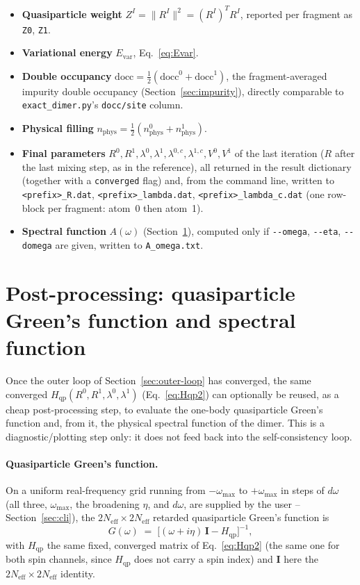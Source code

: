 \documentclass[11pt]{article}
\newcommand{\Neff}{N_{\mathrm{eff}}}
\newcommand{\Hqp}{H_{\mathrm{qp}}}
\begin{document}
\begin{itemize}
  \item \textbf{Quasiparticle weight} $Z^{I}=\lVert R^{I}\rVert^2=(R^I)^TR^I$,
    reported per fragment as \texttt{Z0}, \texttt{Z1}.
  \item \textbf{Variational energy} $E_{\mathrm{var}}$, Eq.~\eqref{eq:Evar}.
  \item \textbf{Double occupancy} $\mathrm{docc}=\tfrac12(\mathrm{docc}^0+\mathrm{docc}^1)$,
    the fragment-averaged impurity double occupancy (Section~\ref{sec:impurity}),
    directly comparable to \texttt{exact\_dimer.py}'s \texttt{docc/site} column.
  \item \textbf{Physical filling} $n_{\mathrm{phys}}=\tfrac12(n^0_{\mathrm{phys}}+n^1_{\mathrm{phys}})$.
  \item \textbf{Final parameters} $R^0,R^1,\lambda^0,\lambda^1,\lambda^{0,c},
    \lambda^{1,c},V^0,V^1$ of the last iteration ($R$ after the last mixing
    step, as in the reference), all returned in the result dictionary
    (together with a \texttt{converged} flag) and, from
    the command line, written to \texttt{<prefix>\_R.dat},
    \texttt{<prefix>\_lambda.dat}, \texttt{<prefix>\_lambda\_c.dat} (one
    row-block per fragment: atom~0 then atom~1).
  \item \textbf{Spectral function} $A(\omega)$ (Section~\ref{sec:spectral}),
    computed only if \texttt{-{}-omega}, \texttt{-{}-eta}, \texttt{-{}-domega}
    are given, written to \texttt{A\_omega.txt}.
\end{itemize}

\section{Post-processing: quasiparticle Green's function and spectral function}
\label{sec:spectral}

Once the outer loop of Section~\ref{sec:outer-loop} has converged, the same
converged $\Hqp(R^0,R^1,\lambda^0,\lambda^1)$ (Eq.~\eqref{eq:Hqp2}) can
optionally be reused, as a cheap post-processing step, to evaluate the
one-body quasiparticle Green's function and, from it, the physical spectral
function of the dimer. This is a diagnostic/plotting step only: it does not
feed back into the self-consistency loop.

\paragraph{Quasiparticle Green's function.} On a uniform real-frequency grid
running from $-\omega_{\max}$ to $+\omega_{\max}$ in steps of
$d\omega$ (all three, $\omega_{\max}$, the broadening $\eta$, and $d\omega$,
are supplied by the user -- Section~\ref{sec:cli}), the $2\Neff\times2\Neff$
retarded quasiparticle Green's function is
\begin{equation}
  G(\omega) \;=\; \bigl[(\omega+i\eta)\,\mathbf{I} - \Hqp\bigr]^{-1},
  \label{eq:Gqp}
\end{equation}
with $\Hqp$ the same fixed, converged matrix of Eq.~\eqref{eq:Hqp2} (the
same one for both spin channels, since $\Hqp$ does not carry a spin index)
and $\mathbf I$ here the $2\Neff\times2\Neff$ identity.
\end{document}
